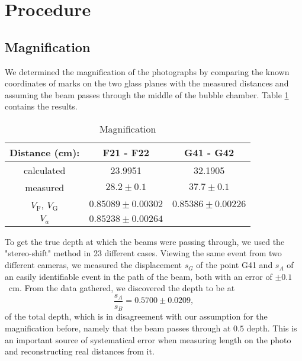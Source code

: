 \documentclass[twocolumn]{article}
\begin{document}
\section{Procedure} \label{sec:Proc}
\subsection{Magnification}
We determined the magnification of the photographs by comparing the known coordinates of marks on the two glass planes with the measured distances and assuming the beam passes through the middle of the bubble chamber.\cite{seul} Table \ref{tab:magnification} contains the results.
\begin{table}
\centering
\begin{tabular}{|c|c|c|}
\hline
Distance (cm):	&	F21	- F22	&	G41	- G42\\\hline
calculated	&	23.9951		&  32.1905\\\hline
measured	&	$28.2 \pm 0.1$		&  $37.7 \pm 0.1$	\\\hline
$V_{\text{F}}$, $V_{\text{G}}$	& $0.85089 \pm 0.00302$	& $0.85386 \pm 0.00226$\\\cline{1-3}
$V_{a}$	& $0.85238 \pm 	0.00264$ \\
\cline{1-2}
\end{tabular}
\caption{Magnification}
\label{tab:magnification}
\end{table}
\par To get the true depth at which the beams were passing through, we used the "stereo-shift" method in 23 different cases. Viewing the same event from two different cameras, we measured the displacement $s_G$ of the point G41 and $s_A$ of an easily identifiable event in the path of the beam, both with an error of $\pm 0.1$~cm. From the data gathered, we discovered the depth to be at
\begin{equation}
\frac{s_A}{s_B} = 0.5700 \pm 0.0209,
\end{equation}
of the total depth, which is in disagreement with our assumption for the magnification before, namely that the beam passes through at $0.5$ depth. This is an important source of systematical error when measuring length on the photo and reconstructing real distances from it.
\end{document}
